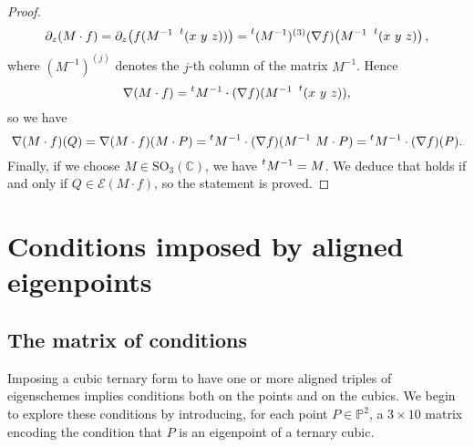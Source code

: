 \documentclass{amsart}
\theoremstyle{plain}
\theoremstyle{definition}
\newcommand{\p}{\mathbb{P}}
\newcommand{\Eig}[1]{\mathcal{E}\!\left( {#1} \right)}
\begin{document}
\begin{proof}
\begin{gather*}
\partial_z (M\cdot f) = \partial_z \bigl( f(M^{-1} \ \prescript{t} {} (x \ y \ z)) \bigr) = \prescript{t} {}(M^{-1})^{(3)}(\nabla f) \bigl( M^{-1}\  \prescript{t} {} (x \ y \ z) \bigr) \,,
\end{gather*}
%
where $(M^{-1})^{(j)}$ denotes the $j$-th column of the matrix $M^{-1}$. Hence
%
\[
\nabla (M \cdot f) = \prescript{t} {} M^{-1} \cdot (\nabla f) (M^{-1}\  \prescript{t} {} (x \ y \ z)),
\]
%
so we have
%
\[
\nabla (M \cdot f)(Q)=\nabla (M \cdot f)(M \cdot P)=
\prescript{t} {} M^{-1} \cdot (\nabla f) (M^{-1}\  M \cdot P)=\prescript{t} {} M^{-1} \cdot (\nabla f)(P).
\]
%
Finally, if we choose $M \in \mathrm{SO}_3(\mathbb{C})$, we have
$\prescript{t} {} M^{-1}=M$. We deduce that
 holds if and only if $Q \in \Eig{M\cdot f}$, so the statement is proved.
\end{proof}

\section{Conditions imposed by aligned eigenpoints}
\label{conditions}

\subsection{The matrix of conditions}

Imposing a cubic ternary form to have one or more aligned triples of eigenschemes implies conditions both on the points and on the cubics.
We begin to explore these conditions by introducing, for each point
$P \in \p^2$,
a $3 \times 10$ matrix encoding the condition that $P$ is an eigenpoint of a ternary cubic.
\end{document}
